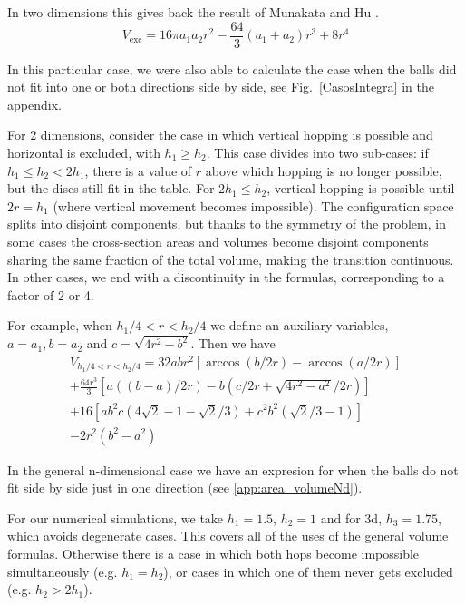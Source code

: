 \documentclass[superscriptaddress,pre,reprint,showpacs,twocolumn]{revtex4-1}
\begin{document}
In two dimensions this gives back the result of Munakata and Hu \cite{Munakata02}.
\begin{equation}
V_\text{exc} = 16 \pi a_1 a_2 r^{2} - \textstyle \frac{64}{3} (a_1+a_2) r^{3}  + 8 r^{4}
\end{equation}

In this particular case, we were also able to calculate the case when the balls
did not fit into one or both directions side by side,
see Fig.~\ref{CasosIntegra} in the appendix. 

For 2 dimensions, 
consider the case  in which vertical hopping is possible
and horizontal is excluded, with  $h_1 \geq h_2$.
This case divides into two sub-cases: if
$ h_1 \leq  h_2 < 2 h_1 $,
there is a value of $r$ above which hopping is no longer possible,
but the discs still fit in the table. For $2 h_1 \leq h_2 $, vertical hopping is
possible until $ 2 r= h_1$ (where vertical movement becomes impossible). 
The configuration space splits into disjoint components, but 
thanks to the symmetry of
the problem, in some cases the cross-section areas and 
volumes become disjoint components sharing the same fraction of
the total volume, making the transition continuous. In other cases, we end with 
a discontinuity in the formulas,
corresponding to a factor of 2 or 4. 


For example, when $h_1/4 < r < h_2/4$ 
we define an auxiliary variables, $a=a_1, b=a_2$
and
$c = \sqrt{4r^2-b^2}$. Then we have
\begin{multline}\label{VolumenCasoFeo}
V_{h_1/4<r<h_2/4} = 32abr^2 \left[ \arccos(b/2r)-\arccos(a/2r) \right]\\
+\frac{64 r^3}{3 } \left[ a((b-a)/2r)-b(c/2r+\sqrt{4r^2-a^2}/2r) \right]\\
+16 \left[ a b^2 c (4\sqrt{2}-1-\sqrt{2}/3) 
  +c^2b^2 (\sqrt{2}/3-1) \right]\\
-2r^2 (b^2-a^2)
\end{multline}

In the general n-dimensional case we have an expresion for when the balls
do not fit side by side just in one direction (see \ref{app:area_volumeNd}).

For our numerical simulations, we take $h_1=1.5$, $h_2=1$ and for 3d, $h_3=1.75$,
which avoids degenerate cases. 
This covers all of the uses of the general volume formulas.
Otherwise there is a case in which both hops become impossible simultaneously
(e.g. $h_1=h_2$), or cases in which one of them never gets excluded (e.g. $h_2>2h_1$).
\end{document}
